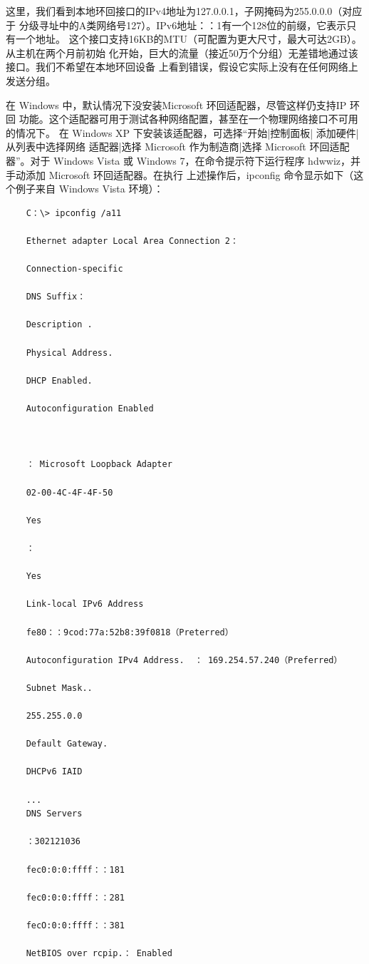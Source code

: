这里，我们看到本地环回接口的IPv4地址为127.0.0.1，子网掩码为255.0.0.0（对应于
分级寻址中的A类网络号127）。IPv6地址：：1有一个128位的前缀，它表示只有一个地址。
这个接口支持16KB的MTU（可配置为更大尺寸，最大可达2GB）。从主机在两个月前初始
化开始，巨大的流量（接近50万个分组）无差错地通过该接口。我们不希望在本地环回设备
上看到错误，假设它实际上没有在任何网络上发送分组。

在 Windows 中，默认情况下没安装Microsoft 环回适配器，尽管这样仍支持IP 环回
功能。这个适配器可用于测试各种网络配置，甚至在一个物理网络接口不可用的情况下。
在 Windows XP 下安装该适配器，可选择“开始|控制面板| 添加硬件| 从列表中选择网络
适配器|选择 Microsoft 作为制造商|选择 Microsoft 环回适配器”。对于 Windows Vista 或
Windows 7，在命令提示符下运行程序 hdwwiz，并手动添加 Microsoft 环回适配器。在执行
上述操作后，ipconfig 命令显示如下（这个例子来自 Windows Vista 环境）：

\begin{verbatim}
    C：\> ipconfig /a11
    
    Ethernet adapter Local Area Connection 2：
    
    Connection-specific
    
    DNS Suffix：
    
    Description .
    
    Physical Address.
    
    DHCP Enabled.
    
    Autoconfiguration Enabled
    
    
    
    ： Microsoft Loopback Adapter
    
    02-00-4C-4F-4F-50
    
    Yes
    
    ：
    
    Yes
    
    Link-local IPv6 Address
    
    fe80：：9cod:77a:52b8:39f0818（Preterred）
    
    Autoconfiguration IPv4 Address.  ： 169.254.57.240（Preferred）
    
    Subnet Mask..
    
    255.255.0.0
    
    Default Gateway. 
    
    DHCPv6 IAID
    
    ...
    DNS Servers
    
    ：302121036
    
    fec0:0:0:ffff：：181
    
    fec0:0:0:ffff：：281
    
    fecO:0:0:ffff：：381
    
    NetBIOS over rcpip.： Enabled
\end{verbatim}


